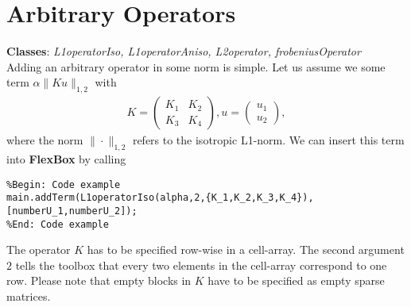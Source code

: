 \documentclass[final,leqno,onefignum,onetabnum]{article}
\newcommand{\1}[1]{\mathds{1}_{#1}}
\begin{document}
\section{Arbitrary Operators}
\textbf{Classes}: \textit{L1operatorIso, L1operatorAniso, L2operator, frobeniusOperator}\\
Adding an arbitrary operator in some norm is simple. Let us assume we some term $\alpha \|Ku\|_{1,2}$ with 
\begin{align*}
	K=\begin{pmatrix}K_1&K_2\\K_3&K_4\end{pmatrix}, u=\begin{pmatrix}u_1\\u_2\end{pmatrix},
\end{align*}
where the norm $\|\cdot\|_{1,2}$ refers to the isotropic L1-norm. We can insert this term into \textbf{FlexBox} by calling
\begin{lstlisting} 
%Begin: Code example
main.addTerm(L1operatorIso(alpha,2,{K_1,K_2,K_3,K_4}),[numberU_1,numberU_2]);
%End: Code example
\end{lstlisting}
The operator $K$ has to be specified row-wise in a cell-array. The second argument $2$ tells the toolbox that every two elements in the cell-array correspond to one row. Please note that empty blocks in $K$ have to be specified as empty sparse matrices.
\end{document}
